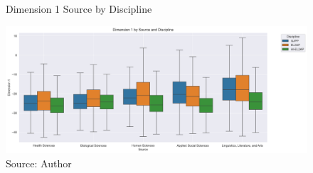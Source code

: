 \begin{figure}[htbp]
    \centering
    \captionsetup{justification = raggedright, singlelinecheck = false}
    \caption{Dimension 1 Source by Discipline}
    \label{fig:dim1_by_source_by_discipline}
    \includegraphics[scale=0.7]{figures/dim1_by_source_by_discipline.png}
    \caption*{Source: Author}
\end{figure}
